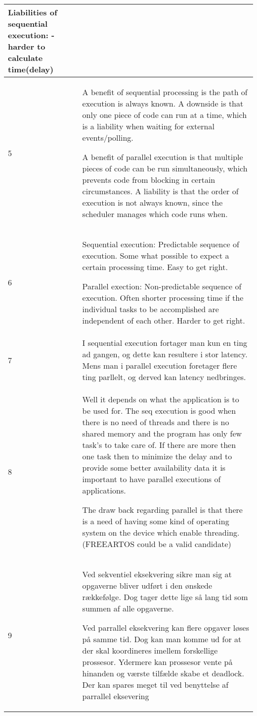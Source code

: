 \begin{longtable}{|p{0.3cm}|p{14.7cm}|}
\noindent Liabilities of sequential execution: - harder to calculate time(delay) \\ \hline

5 & A benefit of sequential processing is the path of execution is always known. A downside is that only one piece of code can run at a time, which is a liability when waiting for external events/polling.

\noindent A benefit of parallel execution is that multiple pieces of code can be run simultaneously, which prevents code from blocking in certain circumstances. A liability is that the order of execution is not always known, since the scheduler manages which code runs when. \\ \hline

6 & Sequential execution: Predictable sequence of execution. Some what possible to expect a certain processing time. Easy to get right.

\noindent Parallel exection: Non-predictable sequence of execution. Often shorter processing time if the individual tasks to be accomplished are independent of each other. Harder to get right. \\ \hline

7 & I sequential execution fortager man kun en ting ad gangen, og dette kan resultere i stor latency. Mens man i parallel execution foretager flere ting parllelt, og derved kan latency nedbringes. \\ \hline

8 & Well it depends on what the application is to be used for. The seq execution is good when there is no need of threads and there is no shared memory and the program has only few task's to take care of. If there are more then one task then to minimize the delay and to provide some better availability data it is important to have parallel executions of applications. 

\noindent The draw back regarding parallel is that there is a need of having some kind of operating system on the device which enable threading. (FREEARTOS could be a valid candidate) \\ \hline

9 & Ved sekventiel eksekvering sikre man sig at opgaverne bliver udført i den ønskede rækkefølge. Dog tager dette lige så lang tid som summen af alle opgaverne.

\noindent Ved parrallel eksekvering kan flere opgaver løses på samme tid. Dog kan man komme ud for at der skal koordineres imellem forskellige prossesor. Ydermere kan prossesor vente på hinanden og værste tilfælde skabe et deadlock. Der kan spares meget til ved benyttelse af parrallel eksevering \\ \hline


\end{longtable}
